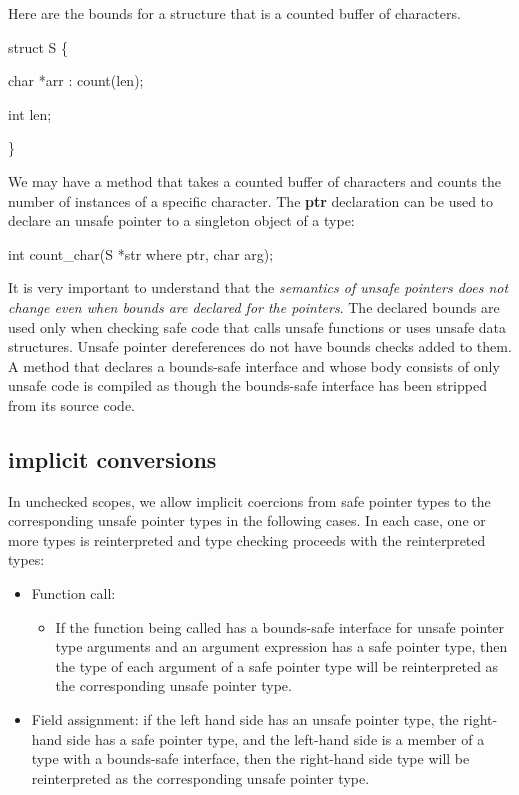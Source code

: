 \documentclass[]{article}
\begin{document}
Here are the bounds for a structure that is a counted buffer of
characters.

struct S \{

char *arr : count(len);

int len;

\}

We may have a method that takes a counted buffer of characters and
counts the number of instances of a specific character. The \textbf{ptr}
declaration can be used to declare an unsafe pointer to a singleton
object of a type:

int count\_char(S *str where ptr, char arg);

It is very important to understand that the \emph{semantics of unsafe
pointers does not change even when bounds are declared for the
pointers}. The declared bounds are used only when checking safe code
that calls unsafe functions or uses unsafe data structures. Unsafe
pointer dereferences do not have bounds checks added to them. A method
that declares a bounds-safe interface and whose body consists of only
unsafe code is compiled as though the bounds-safe interface has been
stripped from its source code.

\subsection{\texorpdfstring{\protect\hypertarget{ux5fRef424639711}{}{\protect\hypertarget{ux5fToc426641114}{}{\protect\hypertarget{ux5fToc435434973}{}{\protect\hypertarget{ux5fToc437460804}{}{\protect\hypertarget{ux5fToc440445485}{}{\protect\hypertarget{ux5fToc440449267}{}{\protect\hypertarget{ux5fToc440551917}{}{}}}}}}}implicit
conversions}{implicit conversions}}\label{implicit-conversions}

In unchecked scopes, we allow implicit coercions from safe pointer types
to the corresponding unsafe pointer types in the following cases. In
each case, one or more types is reinterpreted and type checking proceeds
with the reinterpreted types:

\begin{itemize}
\item
  Function call:

  \begin{itemize}
  \item
    If the function being called has a bounds-safe interface for unsafe
    pointer type arguments and an argument expression has a safe pointer
    type, then the type of each argument of a safe pointer type will be
    reinterpreted as the corresponding unsafe pointer type.
  \end{itemize}
\item
  Field assignment: if the left hand side has an unsafe pointer type,
  the right-hand side has a safe pointer type, and the left-hand side is
  a member of a type with a bounds-safe interface, then the right-hand
  side type will be reinterpreted as the corresponding unsafe pointer
  type.
\end{itemize}
\end{document}

